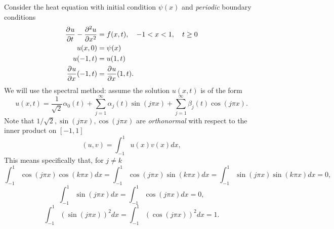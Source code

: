 
Consider the heat equation with initial condition $\psi(x)$ and \textit{periodic} boundary conditions
\begin{align*}
\frac{\partial^{} u}{\partial t^{}} - \frac{\partial^{2} u}{\partial x^{2}} &= f(x,t),\quad -1 < x < 1, \quad t \geq 0\\
u(x,0) &= \psi(x)\\
u(-1,t) &= u(1,t)\\
\frac{\partial^{} u}{\partial x^{}}(-1,t) &= \frac{\partial^{} u}{\partial x^{}}(1,t).
\end{align*}
We will use the spectral method: assume the solution $u(x,t)$ is of the form
\[
u(x,t) = \frac{1}{\sqrt{2}}\alpha_0(t) + \sum_{j=1}^\infty \alpha_j(t)\sin(j\pi x) + \sum_{j=1}^\infty \beta_j(t)\cos(j\pi x).
\]
Note that $1/\sqrt{2}, \sin(j\pi x), \cos(j\pi x)$ are \emph{orthonormal} with respect to the inner product on $[-1,1]$
\[
\left(u,v\right) = \int_{-1}^1 u(x)v(x) dx,
\]
This means specifically that, for $j \neq k$
\[
\int_{-1}^1 \cos(j\pi x)\cos(k\pi x)dx = \int_{-1}^1 \cos(j\pi x)\sin(k\pi x)dx = \int_{-1}^1 \sin(j\pi x)\sin(k\pi x)dx = 0,
\]
\[
\int_{-1}^1 \sin(j\pi x)dx = \int_{-1}^1 \cos(j\pi x)dx = 0,
\]
\[
\int_{-1}^1 \left(\sin(j\pi x)\right)^2 dx = \int_{-1}^1 \left(\cos(j\pi x)\right)^2 dx = 1.
\]
\vspace{5em}

